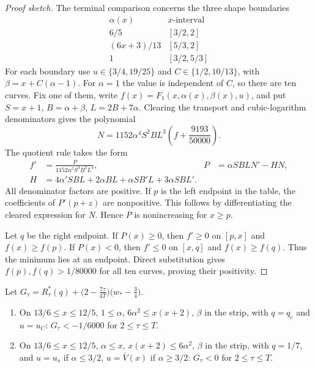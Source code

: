 \begin{proof}[Proof sketch]
The terminal comparison concerns the three shape boundaries
\[
\begin{array}{c|c}
 \alpha(x)&x\text{-interval}\\\hline
 6/5 &[3/2,2]\\
 (6x+3)/13 &[5/3,2]\\
 1 &[3/2,5/3]
\end{array}
\]
For each boundary use $u\in\{3/4,19/25\}$ and
$C\in\{1/2,10/13\}$, with $\beta=x+C(\alpha-1)$.
For $\alpha=1$ the value is independent of $C$, so there are ten curves.
Fix one of them, write $f(x)=F_1(x,\alpha(x),\beta(x),u)$, and put
$S=x+1$, $B=\alpha+\beta$, $L=2B+7\alpha$.
Clearing the transport and cubic-logarithm denominators gives the polynomial
\[
 N=1152\alpha^4S^2BL^3\left(f+\frac{9193}{50000}\right).
\]
The quotient rule takes the form
\begin{align*}
 f'&=\frac{P}{1152\alpha^5S^3B^2L^4},&
 P&=\alpha SBLN'-HN,\\
 H&=4\alpha'SBL+2\alpha BL+\alpha SB'L+3\alpha SBL'.
\end{align*}
All denominator factors are positive. If $p$ is the left endpoint in the
table, the coefficients of $P'(p+z)$ are nonpositive. This follows by
differentiating the cleared expression for $N$. Hence $P$ is nonincreasing
for $x\ge p$.

Let $q$ be the right endpoint. If $P(x)\ge0$, then $f'\ge0$ on $[p,x]$
and $f(x)\ge f(p)$. If $P(x)<0$, then $f'\le0$ on $[x,q]$ and
$f(x)\ge f(q)$. Thus the minimum lies at an endpoint. Direct substitution
gives $f(p),f(q)>1/80000$ for all ten curves, proving their positivity.


\end{proof}

\begin{proposition}\label{prop:ss-face-S2}
Let $G_\tau=R^*_\tau(q)+\bigl(2-\frac{7\tau}{4T}\bigr)\bigl(w_*-\frac34\bigr)$.
\begin{enumerate}[label=(\alph*)]
\item On $13/6\le x\le12/5$, $1\le\alpha$, $6\alpha^2\le x(x+2)$, $\beta$ in the strip, with
  $q=q_c$ and $u=u_C$: $G_\tau<-1/6000$ for $2\le\tau\le T$.
\item On $13/6\le x\le12/5$, $\alpha\le x$, $x(x+2)\le6\alpha^2$, $\beta$ in the strip, with
  $q=1/7$, and $u=u_s$ if $\alpha\le3/2$, $u=\bar V(x)$ if $\alpha\ge3/2$: $G_\tau<0$ for
  $2\le\tau\le T$.
\end{enumerate}
\end{proposition}

